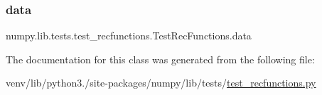 \subsubsection{\texorpdfstring{data}{data}}
{\footnotesize\ttfamily numpy.\+lib.\+tests.\+test\+\_\+recfunctions.\+Test\+Rec\+Functions.\+data}



The documentation for this class was generated from the following file\+:\begin{DoxyCompactItemize}
\item 
venv/lib/python3./site-\/packages/numpy/lib/tests/\hyperlink{test__recfunctions_8py}{test\+\_\+recfunctions.\+py}\end{DoxyCompactItemize}
